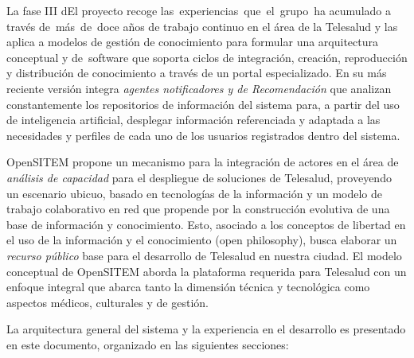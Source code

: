 La fase III dEl proyecto recoge las experiencias que el grupo ha acumulado a través de más de doce años de trabajo continuo en el área de la Telesalud y las aplica a modelos de gestión de conocimiento para formular una arquitectura conceptual y de software que soporta ciclos de integración, creación, reproducción y distribución de conocimiento a través de un portal especializado. En su más reciente versión integra \textit{agentes notificadores y de Recomendación} que analizan constantemente los repositorios de información del sistema para, a partir del uso de inteligencia artificial, desplegar información referenciada y adaptada a las necesidades y perfiles de cada uno de los usuarios registrados dentro del sistema.

OpenSITEM propone un mecanismo para la integración de actores en el área de \textit{análisis de capacidad} para el despliegue de soluciones de Telesalud, proveyendo un escenario ubicuo, basado en tecnologías de la información y un modelo de trabajo colaborativo en red que propende por la construcción evolutiva de una base de información y conocimiento. Esto, asociado a los conceptos de libertad en el uso de la información y el conocimiento (open philosophy), busca elaborar un \textit{recurso público} base para el desarrollo de Telesalud en nuestra ciudad. El modelo conceptual de OpenSITEM aborda la plataforma requerida para Telesalud con un enfoque integral que abarca tanto la dimensión técnica y tecnológica como aspectos médicos, culturales y de gestión. 

La arquitectura general del sistema y la experiencia en el desarrollo es presentado en este documento, organizado en las siguientes secciones:

